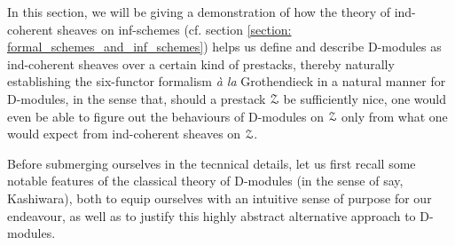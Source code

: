         In this section, we will be giving a demonstration of how the theory of ind-coherent sheaves on inf-schemes (cf. section \ref{section: formal_schemes_and_inf_schemes}) helps us define and describe D-modules as ind-coherent sheaves over a certain kind of prestacks, thereby naturally establishing the six-functor formalism \textit{\`a la} Grothendieck in a natural manner for D-modules, in the sense that, should a prestack $\mathcal{Z}$ be sufficiently nice, one would even be able to figure out the behaviours of D-modules on $\mathcal{Z}$ only from what one would expect from ind-coherent sheaves on $\mathcal{Z}$. 
        
        Before submerging ourselves in the tecnnical details, let us first recall some notable features of the classical theory of D-modules (in the sense of say, Kashiwara), both to equip ourselves with an intuitive sense of purpose for our endeavour, as well as to justify this highly abstract alternative approach to D-modules. 
